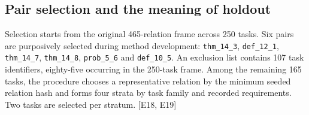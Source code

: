 \subsection[Pair selection and the meaning of holdout]{\texorpdfstring{\protect\hypertarget{d1}{}Pair selection and the meaning of holdout}{Pair selection and the meaning of holdout}}
Selection starts from the original 465-relation frame across 250 tasks. Six pairs are purposively selected during method development: \nolinkurl{thm_14_3}, \nolinkurl{def_12_1}, \nolinkurl{thm_14_7}, \nolinkurl{thm_14_8}, \nolinkurl{prob_5_6} and \nolinkurl{def_10_5}. An exclusion list contains 107 task identifiers, eighty-five occurring in the 250-task frame. Among the remaining 165 tasks, the procedure chooses a representative relation by the minimum seeded relation hash and forms four strata by task family and recorded requirements. Two tasks are selected per stratum. [E18, E19]

